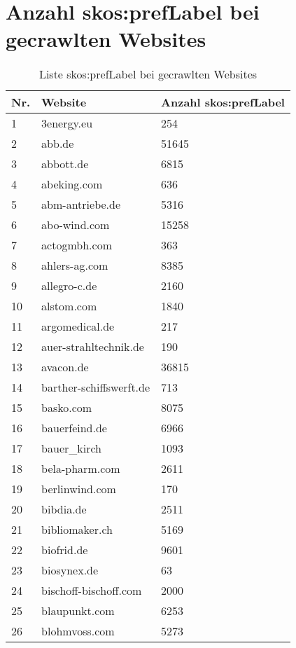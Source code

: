 %
\section{Anzahl skos:prefLabel bei gecrawlten Websites}\label{sec:listepreflabel}
\begin{longtable}{|m{0.5cm}||m{8cm}|m{5cm}|}
	\caption{Liste skos:prefLabel bei gecrawlten Websites}\label{tbl:preflabel}\\%
	\hline
	\textbf{Nr.} & \textbf{Website} & \textbf{Anzahl skos:prefLabel} \\
	\hline \hline
	1 & 3energy.eu & 254\\
	\hline
	2 & abb.de & 51645\\
	\hline
	3 & abbott.de & 6815\\
	\hline
	4 & abeking.com & 636\\
	\hline
	5 & abm-antriebe.de & 5316\\
	\hline
	6 & abo-wind.com & 15258\\
	\hline
	7 & actogmbh.com & 363\\
	\hline
	8 & ahlers-ag.com & 8385\\
	\hline
	9 & allegro-c.de & 2160\\
	\hline
	10 & alstom.com & 1840\\
	\hline
	11 & argomedical.de & 217\\
	\hline
	12 & auer-strahltechnik.de & 190\\
	\hline
	13 & avacon.de & 36815\\
	\hline
	14 & barther-schiffswerft.de & 713\\
	\hline
	15 & basko.com & 8075\\
	\hline
	16 & bauerfeind.de & 6966\\
	\hline
	17 & bauer_kirch & 1093\\
	\hline
	18 & bela-pharm.com & 2611\\
	\hline
	19 & berlinwind.com & 170\\
	\hline
	20 & bibdia.de & 2511\\
	\hline
	21 & bibliomaker.ch & 5169\\
	\hline
	22 & biofrid.de & 9601\\
	\hline
	23 & biosynex.de & 63\\
	\hline
	24 & bischoff-bischoff.com & 2000\\
	\hline
	25 & blaupunkt.com & 6253\\
	\hline
	26 & blohmvoss.com & 5273\\

\end{longtable}
